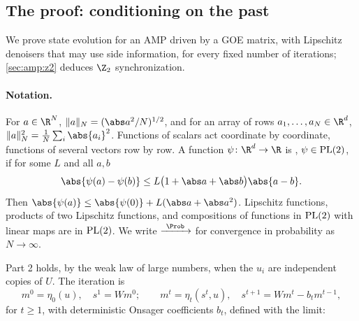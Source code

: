 \begin{refsection}
\section{The proof: conditioning on the past}\label{sec:amp:proof}

We prove state evolution for an AMP driven by a GOE matrix, with Lipschitz denoisers that may use side information, for every fixed number of iterations; \cref{sec:amp:z2} deduces $\Z_2$ synchronization.

\paragraph{Notation.} For $a\in\R^N$, $\ampnorm a=(\abs a^2/N)^{1/2}$, and for an array of rows $a_1,\dots,a_N\in\R^d$, $\ampnorm a^2=\frac1N\sum_i\abs{a_i}^2$. Functions of scalars act coordinate by coordinate, functions of several vectors row by row. A function $\psi\colon\R^d\to\R$ is , $\psi\in\mathrm{PL}(2)$, if for some $L$ and all $a,b$
\begin{equation}\label{eq:amp:pl}
\abs{\psi(a)-\psi(b)}\le L\bigl(1+\abs a+\abs b\bigr)\abs{a-b}.
\end{equation}
Then $\abs{\psi(a)}\le\abs{\psi(0)}+L(\abs a+\abs a^2)$. Lipschitz functions, products of two Lipschitz functions, and compositions of functions in $\mathrm{PL}(2)$ with linear maps are in $\mathrm{PL}(2)$. We write $\ampto$ for convergence in probability as $N\to\infty$.


Part 2 holds, by the weak law of large numbers, when the $u_i$ are independent copies of $U$. The iteration is
\begin{equation}\label{eq:amp:amp}
m^0=\eta_0(u),\quad s^1=Wm^0;\qquad m^t=\eta_t(s^t,u),\quad s^{t+1}=Wm^t-b_tm^{t-1},
\end{equation}
for $t\ge1$, with deterministic Onsager coefficients $b_t$, defined with the limit:


\end{refsection}
